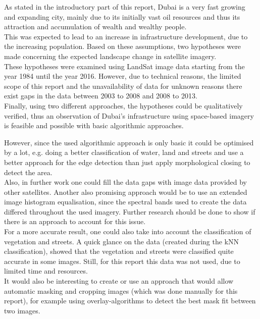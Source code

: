 As stated in the introductory part of this report, Dubai is a very fast growing and expanding city, mainly due to its initially vast oil resources and thus its attraction and accumulation of wealth and wealthy people.\\
This was expected to lead to an increase in infrastructure development, due to the increasing population. Based on these assumptions, two hypotheses were made concerning the expected landscape change in satellite imagery.\\
These hypotheses were examined using LandSat image data starting from the year 1984 until the year 2016. However, due to technical reasons, the limited scope of this report and the unavailability of data for unknown reasons there exist gaps in the data between 2003 to 2008 and 2008 to 2013.\\
Finally, using two different approaches, the hypotheses could be qualitatively verified, thus an observation of Dubai's infrastructure using space-based imagery is feasible and possible with basic algorithmic approaches.

However, since the used algorithmic approach is only basic it could be optimised by a lot, e.g. doing a better classification of water, land and streets and use a better approach for the edge detection than just apply morphological closing to detect the area.\\
Also, in further work one could fill the data gaps with image data provided by other satellites. Another also promising approach would be to use an extended image histogram equalisation, since the spectral bands used to create the data differed throughout the used imagery. Further research should be done to show if there is an approach to account for this issue.\\
For a more accurate result, one could also take into account the classification of vegetation and streets. A quick glance on the data (created during the kNN classification), showed that the vegetation and streets were classified quite accurate in some images. Still, for this report this data was not used, due to limited time and resources.\\
It would also be interesting to create or use an approach that would allow automatic masking and cropping images (which was done manually for this report), for example using overlay-algorithms to detect the best mask fit between two images.

